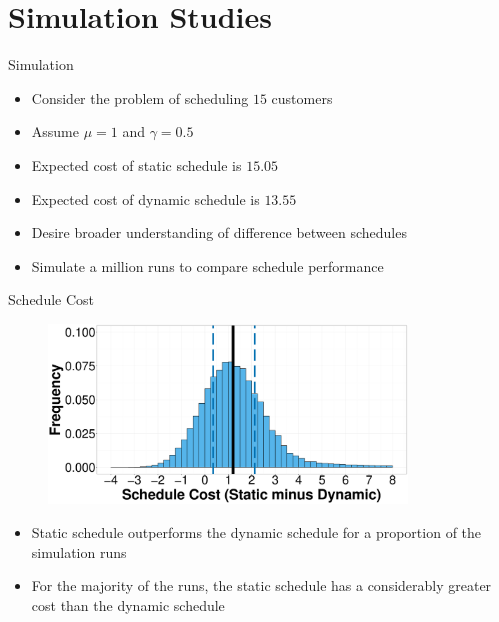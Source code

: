\documentclass{beamer}
\begin{document}
\section{Simulation Studies}

\begin{frame}{Simulation}
	\begin{itemize}
		\item Consider the problem of scheduling $15$ customers
		\item Assume $\mu = 1$ and $\gamma = 0.5$
		\item Expected cost of static schedule is $15.05$
		\item Expected cost of dynamic schedule is $13.55$
		\item Desire broader understanding of difference between schedules
		\item Simulate a million runs to compare schedule performance
	\end{itemize}
\end{frame}

\begin{frame}{Schedule Cost}
	\begin{figure}
		\centering
		\includegraphics[width=0.85\textwidth]{Cost_Hist_Diff.eps}
	\end{figure}

	\begin{itemize}
		\item Static schedule outperforms the dynamic schedule for a proportion of the simulation runs
		\item For the majority of the runs, the static schedule has a considerably greater cost than the dynamic schedule
	\end{itemize}
\end{frame}
\end{document}
